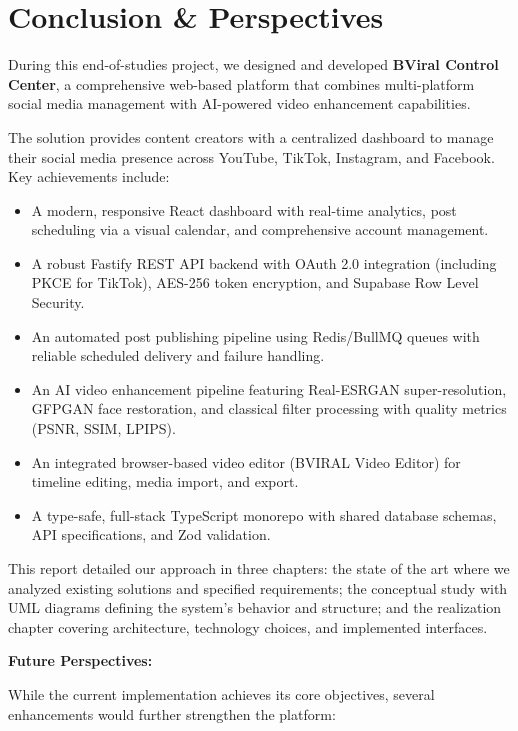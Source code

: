 \chapter*{Conclusion \& Perspectives}

During this end-of-studies project, we designed and developed \textbf{BViral Control Center}, a comprehensive web-based platform that combines multi-platform social media management with AI-powered video enhancement capabilities.

The solution provides content creators with a centralized dashboard to manage their social media presence across YouTube, TikTok, Instagram, and Facebook. Key achievements include:

\begin{itemize}
    \item A modern, responsive React dashboard with real-time analytics, post scheduling via a visual calendar, and comprehensive account management.
    \item A robust Fastify REST API backend with OAuth 2.0 integration (including PKCE for TikTok), AES-256 token encryption, and Supabase Row Level Security.
    \item An automated post publishing pipeline using Redis/BullMQ queues with reliable scheduled delivery and failure handling.
    \item An AI video enhancement pipeline featuring Real-ESRGAN super-resolution, GFPGAN face restoration, and classical filter processing with quality metrics (PSNR, SSIM, LPIPS).
    \item An integrated browser-based video editor (BVIRAL Video Editor) for timeline editing, media import, and export.
    \item A type-safe, full-stack TypeScript monorepo with shared database schemas, API specifications, and Zod validation.
\end{itemize}

This report detailed our approach in three chapters: the state of the art where we analyzed existing solutions and specified requirements; the conceptual study with UML diagrams defining the system's behavior and structure; and the realization chapter covering architecture, technology choices, and implemented interfaces.

\vspace{0.5cm}
\textbf{Future Perspectives:}

While the current implementation achieves its core objectives, several enhancements would further strengthen the platform:

